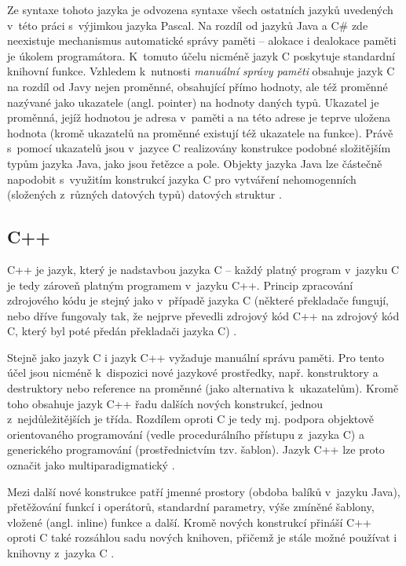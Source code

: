 \documentclass[onepage, a4paper, 12pt]{bakalarka}
\begin{document}
Ze syntaxe tohoto jazyka je odvozena syntaxe všech ostatních jazyků uvedených v~této práci s~výjimkou jazyka Pascal. Na rozdíl od jazyků Java a C\# zde neexistuje mechanismus automatické správy paměti – alokace i dealokace paměti je úkolem programátora. K~tomuto účelu nicméně jazyk C poskytuje standardní knihovní funkce. Vzhledem k~nutnosti \textit{manuální správy paměti} obsahuje jazyk C na rozdíl od Javy nejen proměnné, obsahující přímo hodnoty, ale též proměnné nazývané jako ukazatele (angl. pointer) na hodnoty daných typů. Ukazatel je proměnná, jejíž hodnotou je adresa v~paměti a na této adrese je teprve uložena hodnota (kromě ukazatelů na proměnné existují též ukazatele na funkce). Právě s~pomocí ukazatelů jsou v~jazyce C realizovány konstrukce podobné složitějším typům jazyka Java, jako jsou řetězce a pole. Objekty jazyka Java lze částečně napodobit s~využitím konstrukcí jazyka C pro vytváření nehomogenních (složených z~různých datových typů) datových struktur \cite{c-book, c-guide}.

\subsection{C++}\label{sec:cpp-overview}
C++ je jazyk, který je nadstavbou jazyka C -- každý platný program v~jazyku C je tedy zároveň platným programem v~jazyku C++. Princip zpracování zdrojového kódu je stejný jako v~případě jazyka C (některé překladače fungují, nebo dříve fungovaly tak, že nejprve převedli zdrojový kód C++ na zdrojový kód C, který byl poté předán překladači jazyka C) \cite{cpp-book}.\par
Stejně jako jazyk C i jazyk C++ vyžaduje manuální správu paměti. Pro tento účel jsou nicméně k~dispozici nové jazykové prostředky, např. konstruktory a destruktory nebo reference na proměnné (jako alternativa k~ukazatelům). Kromě toho obsahuje jazyk C++ řadu dalších nových konstrukcí, jednou z~nejdůležitějších je třída. Rozdílem oproti C je tedy mj. podpora objektově orientovaného programování (vedle procedurálního přístupu z~jazyka C) a generického programování (prostřednictvím tzv. šablon). Jazyk C++ lze proto označit jako multiparadigmatický \cite{cpp-book, cpp-guide-classes}.\par
Mezi další nové konstrukce patří jmenné prostory (obdoba balíků v~jazyku Java), přetěžování funkcí i operátorů, standardní parametry, výše zmíněné šablony, vložené (angl. inline) funkce a další. Kromě nových konstrukcí přináší C++ oproti C také rozsáhlou sadu nových knihoven, přičemž je stále možné používat i knihovny z~jazyka C \cite{cpp-book}.\par
\end{document}
